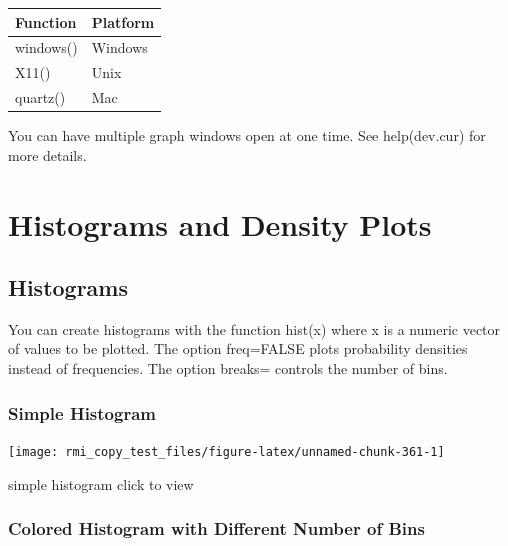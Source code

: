 \documentclass[]{book}
\newenvironment{Shaded}{\begin{snugshade}}{\end{snugshade}}
\newcommand{\KeywordTok}[1]{\textcolor[rgb]{0.13,0.29,0.53}{\textbf{#1}}}
\newcommand{\DataTypeTok}[1]{\textcolor[rgb]{0.13,0.29,0.53}{#1}}
\newcommand{\DecValTok}[1]{\textcolor[rgb]{0.00,0.00,0.81}{#1}}
\newcommand{\StringTok}[1]{\textcolor[rgb]{0.31,0.60,0.02}{#1}}
\newcommand{\OperatorTok}[1]{\textcolor[rgb]{0.81,0.36,0.00}{\textbf{#1}}}
\newcommand{\NormalTok}[1]{#1}
\theoremstyle{definition}
\theoremstyle{definition}
\theoremstyle{definition}
\theoremstyle{remark}
\begin{document}
\begin{longtable}[]{@{}ll@{}}
\toprule
Function & Platform\tabularnewline
\midrule
\endhead
windows() & Windows\tabularnewline
X11() & Unix\tabularnewline
quartz() & Mac\tabularnewline
\bottomrule
\end{longtable}

You can have multiple graph windows open at one time. See help(dev.cur)
for more details.

\section{Histograms and Density
Plots}\label{histograms-and-density-plots}

\subsection{Histograms}\label{histograms}

You can create histograms with the function hist(x) where x is a numeric
vector of values to be plotted. The option freq=FALSE plots probability
densities instead of frequencies. The option breaks= controls the number
of bins.

\subsubsection{Simple Histogram}\label{simple-histogram}

\begin{Shaded}
\end{Shaded}

\begin{center}\texttt{[image: rmi\_copy\_test\_files/figure-latex/unnamed-chunk-361-1]} \end{center}

simple histogram click to view

\subsubsection{Colored Histogram with Different Number of
Bins}\label{colored-histogram-with-different-number-of-bins}

\begin{Shaded}
\end{Shaded}
\end{document}

